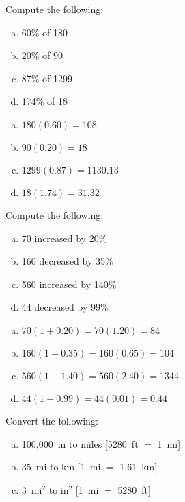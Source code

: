\documentclass[11pt,letterpaper]{article}
\begin{document}

 Compute the following:
\begin{enumerate}[(a)]
\item 60\% of 180
\item 20\% of 90
\item 87\% of 1299
\item 174\% of 18
\end{enumerate} \pspace

\sol
{\itshape
\begin{enumerate}[(a)]
\item $180(0.60)= 108$ \pspace
\item $90(0.20)= 18$ \pspace
\item $1299(0.87)= 1130.13$ \pspace
\item $18(1.74)= 31.32$
\end{enumerate}
}





\newpage





 Compute the following:
\begin{enumerate}[(a)]
\item 70 increased by 20\%
\item 160 decreased by 35\%
\item 560 increased by 140\%
\item 44 decreased by 99\%
\end{enumerate} \pspace

\sol
{\itshape
\begin{enumerate}[(a)]
\item $70(1 + 0.20)= 70(1.20)= 84$ \pspace
\item $160(1 - 0.35)= 160(0.65)= 104$ \pspace
\item $560(1 + 1.40)= 560(2.40)= 1344$ \pspace
\item $44(1 - 0.99)= 44(0.01)= 0.44$
\end{enumerate}
}





\newpage





 Convert the following:
\begin{enumerate}[(a)]
\item 100,000~in to miles [5280~ft $=$ 1~mi]
\item 35~mi to km [1~mi $=$ 1.61~km]
\item 3~mi$^2$ to in$^2$ [1~mi $=$ 5280~ft]
\end{enumerate} \pspace
\end{document}
